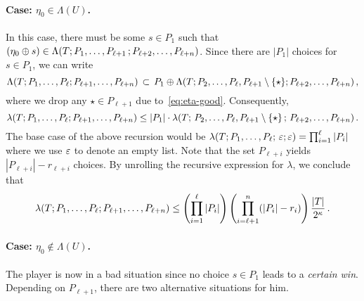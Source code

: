     \paragraph{Case: $\eta_0 \in \Lambda(U)$.}
    In this case, 
    there must be some $s \in P_1$ such that 
    $(\eta_0 \oplus s) \in \Lambda(T; P_1, \ldots, P_{\ell+1}\,; P_{\ell+{2}}, \ldots, P_{\ell + n})$.
    Since there are $|P_1|$ choices for $s \in P_1$, 
    we can write
    \[
        \Lambda(T; P_1, \ldots, P_\ell; P_{\ell+1}, \ldots, P_{\ell+n}) \,\subset\, 
        P_1 \oplus \Lambda(T; P_{2}, \ldots, P_{\ell}, P_{\ell + 1} \setminus \{\star\}; P_{\ell+{2}}, \ldots, P_{\ell + n})
        \,,
    \]
    where we drop any $\star \in P_{\ell + 1}$ due to~\eqref{eq:eta-good}. 
    Consequently, 
    \[
        \lambda(T; P_1, \ldots, P_\ell; P_{\ell+1}, \ldots, P_{\ell+n}) 
        \leq |P_1| \cdot \lambda(T;\, P_{2}, \ldots, P_{\ell}, P_{\ell + 1} \setminus \{\star\}\,;\, P_{\ell+{2}}, \ldots, P_{\ell + n})
        \,.
    \]
    The base case of the above recursion would be
    $
        \lambda(T; P_1, \ldots, P_\ell;\, \varepsilon; \varepsilon) = 
            \prod_{i=1}^\ell |P_i| 
    $ 
    where we use $\varepsilon$ to denote an empty list. 
    Note that the set $P_{\ell + i}$ 
    yields $|P_{\ell + i}| - r_{\ell + i}$ choices.
    By unrolling the recursive expression for $\lambda$, we conclude that
    \begin{equation}\label{eq:lambda-expr-lookahead}
        \lambda(T; P_1, \ldots, P_\ell; P_{\ell+1}, \ldots, P_{\ell+n}) 
        \leq 
            \left( \prod_{i=1}^\ell |P_i| \right) 
            \left( \prod_{i=\ell + 1}^n (|P_i| - r_i)\right)
            \frac{|T|}{2^\kappa}
            \,.
    \end{equation}

    \paragraph{Case: $\eta_0 \not \in \Lambda(U)$.}
    The player is now in a bad situation since 
    no choice $s \in P_1$ leads to a \emph{certain win}.
    Depending on $P_{\ell+1}$, 
    there are two alternative situations for him.    
   
